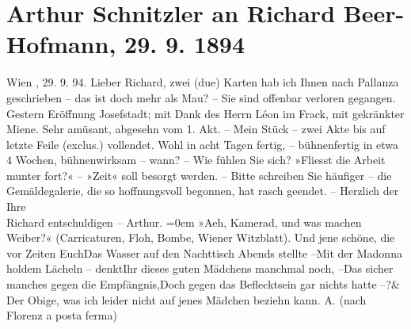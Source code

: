 \documentclass{book}
\newcommand{\stanzaend}{\&}
\begin{document}
              \section {Arthur Schnitzler an Richard Beer-Hofmann, 29. 9. 1894}  \beginnumbering
            \pstart
           Wien  , 29. 9. 94.\pend
           \pstart
           Lieber Richard, {zwei} (due) Karten hab ich Ihnen nach Pallanza geschrieben – das ist doch mehr als Mau? – Sie sind
               offenbar verloren gegangen.\pend
                        \pstart
           Gestern Eröffnung Josefstadt; mit Dank des Herrn Léon   im Frack, mit gekränkter Miene. Sehr amüsant,
               abgesehn vom 1. Akt. –\pend
           \pstart
           Mein Stück – zwei Akte bis auf
               letzte Feile (exclus.) vollendet. Wohl in acht Tagen fertig, – bühnenfertig in etwa
               4 Wochen, bühnenwirksam – wann? –\pend
           \pstart
           Wie fühlen Sie sich? »Fliesst die Arbeit munter fort?« –\pend
           \pstart
           »Zeit«
               soll besorgt werden. – Bitte schreiben Sie häufiger – die Gemäldegalerie, die so
               hoffnungsvoll begonnen, hat rasch geendet. –\pend
           \pstart
           Herzlich der Ihre{\\[\baselineskip]}  {{Richard} entschuldigen – Arthur.}\pend
           \leftskip=0em{}\pstart
           »Aeh, Kamerad, und was machen Weiber?« (Carricaturen, Floh, Bombe, Wiener
                  Witzblatt).\pend
           \stanza{}Und jene schöne, die vor Zeiten Euch\newverse{}Das Wasser auf den Nachttisch Abends stellte –\newverse{}Mit der Madonna holdem Lächeln – denkt\newverse{}Ihr dieses guten Mädchens manchmal noch, –\newverse{}Das sicher manches gegen die Empfängnis,\newverse{}Doch gegen das Beflecktsein gar nichts hatte –?\stanzaend{}\pstart
           Der Obige, was ich leider nicht auf jenes Mädchen beziehn kann.\pend
           \pstart
             {A.}\pend
           \pstart
           (nach Florenz  a posta ferma)\pend
           \endnumbering
\end{document}
